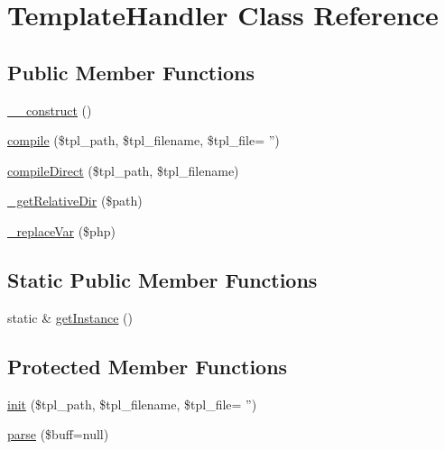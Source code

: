 \hypertarget{classTemplateHandler}{\section{Template\-Handler Class Reference}
\label{classTemplateHandler}
}
\subsection*{Public Member Functions}
\begin{DoxyCompactItemize}
\item 
\hyperlink{classTemplateHandler_ab113c65769e65c4fe531c4cf41655f1d}{\-\_\-\-\_\-construct} ()
\item 
\hyperlink{classTemplateHandler_ae2e69591d815bb49316bb85adbaff581}{compile} (\$tpl\-\_\-path, \$tpl\-\_\-filename, \$tpl\-\_\-file= '')
\item 
\hyperlink{classTemplateHandler_a1fe9c84873c23970ea7779be59dcb2d5}{compile\-Direct} (\$tpl\-\_\-path, \$tpl\-\_\-filename)
\item 
\hyperlink{classTemplateHandler_a6d8e3da7128be8bded89dc9edc4a1bc8}{\-\_\-get\-Relative\-Dir} (\$path)
\item 
\hyperlink{classTemplateHandler_a10cb255c35e1e617f182e349b80cc335}{\-\_\-replace\-Var} (\$php)
\end{DoxyCompactItemize}
\subsection*{Static Public Member Functions}
\begin{DoxyCompactItemize}
\item 
static \& \hyperlink{classTemplateHandler_a9745460c5daccfc48abf8652778b2718}{get\-Instance} ()
\end{DoxyCompactItemize}
\subsection*{Protected Member Functions}
\begin{DoxyCompactItemize}
\item 
\hyperlink{classTemplateHandler_a783df180d319abe3722862ed6edacb9d}{init} (\$tpl\-\_\-path, \$tpl\-\_\-filename, \$tpl\-\_\-file= '')
\item 
\hyperlink{classTemplateHandler_acf0023ac6383d43e9b0ab854c75c0694}{parse} (\$buff=null)
\end{DoxyCompactItemize}


